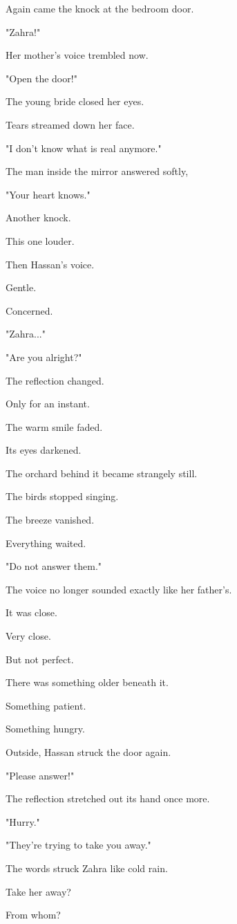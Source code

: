 \documentclass[12pt,openany]{book}
\begin{document}
Again came the knock at the bedroom door.

"Zahra!"

Her mother's voice trembled now.

"Open the door!"

The young bride closed her eyes.

Tears streamed down her face.

"I don't know what is real anymore."

The man inside the mirror answered softly,

"Your heart knows."

Another knock.

This one louder.

Then Hassan's voice.

Gentle.

Concerned.

"Zahra..."

"Are you alright?"

The reflection changed.

Only for an instant.

The warm smile faded.

Its eyes darkened.

The orchard behind it became strangely still.

The birds stopped singing.

The breeze vanished.

Everything waited.

"Do not answer them."

The voice no longer sounded exactly like her father's.

It was close.

Very close.

But not perfect.

There was something older beneath it.

Something patient.

Something hungry.

Outside, Hassan struck the door again.

"Please answer!"

The reflection stretched out its hand once more.

"Hurry."

"They're trying to take you away."

The words struck Zahra like cold rain.

Take her away?

From whom?
\end{document}
